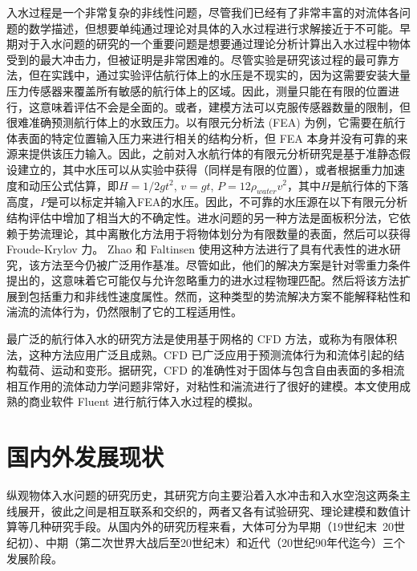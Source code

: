 入水过程是一个非常复杂的非线性问题，尽管我们已经有了非常丰富的对流体各问题的数学描述，但想要单纯通过理论对具体的入水过程进行求解接近于不可能。早期对于入水问题的研究的一个重要问题是想要通过理论分析计算出入水过程中物体受到的最大冲击力，但被证明是非常困难的。尽管实验是研究该过程的最可靠方法，但在实践中，通过实验评估航行体上的水压是不现实的，因为这需要安装大量压力传感器来覆盖所有敏感的航行体上的区域。因此，测量只能在有限的位置进行，这意味着评估不会是全面的。或者，建模方法可以克服传感器数量的限制，但很难准确预测航行体上的水致压力。以有限元分析法 (FEA) 为例，它需要在航行体表面的特定位置输入压力来进行相关的结构分析，但 FEA 本身并没有可靠的来源来提供该压力输入。因此，之前对入水航行体的有限元分析研究是基于准静态假设建立的，其中水压可以从实验中获得（同样是有限的位置），或者根据重力加速度和动压公式估算，即$H = 1 / 2 gt ^2$, $v = gt$, $P = 12 \rho_{water}v^2$，其中$H$是航行体的下落高度，$P$是可以标定并输入FEA的水压。因此，不可靠的水压源在以下有限元分析结构评估中增加了相当大的不确定性。进水问题的另一种方法是面板积分法，它依赖于势流理论，其中离散化方法用于将物体划分为有限数量的表面，然后可以获得 Froude-Krylov 力。 Zhao 和 Faltinsen \cite{zhao1993water}使用这种方法进行了具有代表性的进水研究，该方法至今仍被广泛用作基准。尽管如此，他们的解决方案是针对零重力条件提出的，这意味着它可能仅与允许忽略重力的进水过程物理匹配。然后将该方法扩展到包括重力\cite{sun2007influence}和非线性速度属性\cite{wu2010summary}。然而，这种类型的势流解决方案不能解释粘性和湍流的流体行为，仍然限制了它的工程适用性。

最广泛的航行体入水的研究方法是使用基于网格的 CFD 方法，或称为有限体积法，这种方法应用广泛且成熟。CFD 已广泛应用于预测流体行为\cite{pena2019numerical}和流体引起的结构载荷、运动和变形\cite{huang2019fluid, dashtimanesh2020numerical, tavakoli2021wave}。据研究，CFD 的准确性对于固体与包含自由表面的多相流相互作用的流体动力学问题非常好\cite{windt2020validation, javanmard2020new, huang2021simulation}，对粘性和湍流进行了很好的建模\cite{khojasteh2020numerical}。本文使用成熟的商业软件 Fluent 进行航行体入水过程的模拟。

\section{国内外发展现状}

纵观物体入水问题的研究历史，其研究方向主要沿着入水冲击和入水空泡这两条主线展开，彼此之间是相互联系和交织的，两者又各有试验研究、理论建模和数值计算等几种研究手段。从国内外的研究历程来看，大体可分为早期（19世纪末~20世纪初）、中期（第二次世界大战后至20世纪末）和近代（20世纪90年代迄今）三个发展阶段。

